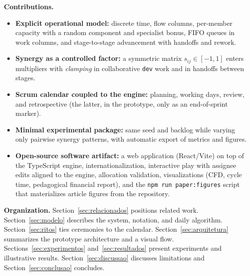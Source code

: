 \textbf{Contributions.}
\begin{itemize}
  \item \textbf{Explicit operational model:} discrete time, flow columns, per-member capacity with a random component and specialist bonus, FIFO queues in work columns, and stage-to-stage advancement with handoffs and rework.
  \item \textbf{Synergy as a controlled factor:} a symmetric matrix $s_{ij}\in[-1,1]$ enters multipliers with \emph{clamping} in collaborative \texttt{dev} work and in handoffs between stages.
  \item \textbf{Scrum calendar coupled to the engine:} planning, working days, review, and retrospective (the latter, in the prototype, only as an end-of-sprint marker).
  \item \textbf{Minimal experimental package:} same seed and backlog while varying only pairwise synergy patterns, with automatic export of metrics and figures.
  \item \textbf{Open-source software artifact:} a web application (React/Vite) on top of the TypeScript engine, internationalization, interactive play with assignee edits aligned to the engine, allocation validation, visualizations (CFD, cycle time, pedagogical financial report), and the \texttt{npm run paper:figures} script that materializes article figures from the repository.
\end{itemize}

\textbf{Organization.} Section~\ref{sec:relacionados} positions related work. Section~\ref{sec:modelo} describes the system, notation, and daily algorithm. Section~\ref{sec:ritos} ties ceremonies to the calendar. Section~\ref{sec:arquitetura} summarizes the prototype architecture and a visual flow. Sections~\ref{sec:experimentos} and~\ref{sec:resultados} present experiments and illustrative results. Section~\ref{sec:discussao} discusses limitations and Section~\ref{sec:conclusao} concludes.
